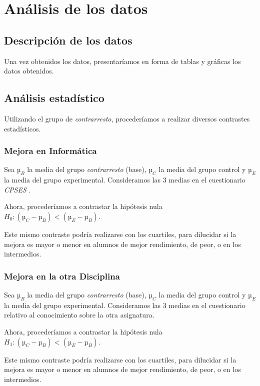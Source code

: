 \documentclass[palatino,miniheader]{apuntesURJC}
\newcommand{\CPSES}{\textit{\gls{CPSES}} \cite{CPSES}}
\begin{document}
\section{Análisis de los datos}

\subsection{Descripción de los datos}

Una vez obtenidos los datos, presentaríamos en forma de tablas y gráficas los datos obtenidos.

\subsection{Análisis estadístico}

Utilizando el grupo de \textit{contrarresto}, procederíamos a realizar diversos contrastes estadísticos.


\subsubsection{Mejora en Informática}

Sea $µ_B$ la media del grupo \textit{contrarresto} (base), $µ_C$ la media del grupo control y $µ_E$ la media del grupo experimental.
%
Consideramos las 3 medias en el cuestionario \CPSES.

Ahora, procederíamos a contrastar la hipótesis nula $H_0: (µ_C - µ_B) < (µ_E - µ_B)$.

Este mismo contraste podría realizarse con los cuartiles, para dilucidar si la mejora es mayor o menor en alumnos de mejor rendimiento, de peor, o en los intermedios.

\subsubsection{Mejora en la otra Disciplina}

Sea $µ_B$ la media del grupo \textit{contrarresto} (base), $µ_C$ la media del grupo control y $µ_E$ la media del grupo experimental.
%
Consideramos las 3 medias en el cuestionario relativo al conocimiento sobre la otra asignatura.

Ahora, procederíamos a contrastar la hipótesis nula $H_1: (µ_C - µ_B) < (µ_E - µ_B)$.

Este mismo contraste podría realizarse con los cuartiles, para dilucidar si la mejora es mayor o menor en alumnos de mejor rendimiento, de peor, o en los intermedios.
\end{document}
